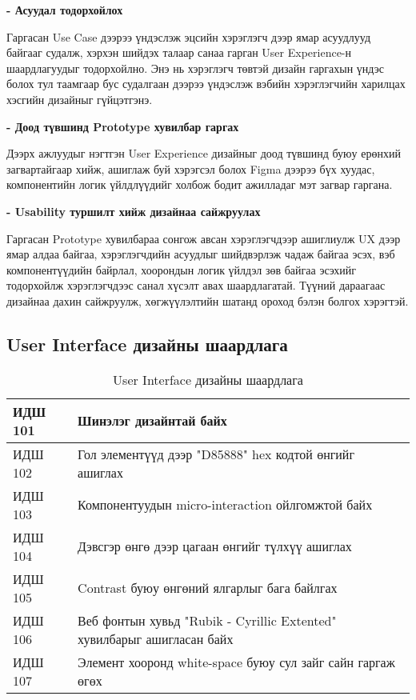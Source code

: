 \textbf{- Асуудал тодорхойлох}

Гаргасан Use Case дээрээ үндэслэж эцсийн хэрэглэгч дээр ямар асуудлууд байгааг судалж, хэрхэн шийдэх талаар санаа гарган User Experience-н шаардлагуудыг тодорхойлно. Энэ нь хэрэглэгч төвтэй дизайн гаргахын үндэс болох тул таамгаар бус судалгаан дээрээ үндэслэж вэбийн хэрэглэгчийн харилцах хэсгийн дизайныг гүйцэтгэнэ.

\textbf{- Доод түвшинд Prototype хувилбар гаргах}

Дээрх ажлуудыг нэгтгэн User Experience дизайныг доод түвшинд буюу ерөнхий загвартайгаар хийж, ашиглаж буй хэрэгсэл болох Figma дээрээ бүх хуудас, компонентийн логик үйлдлүүдийг холбож бодит ажилладаг мэт загвар гаргана.

\textbf{- Usability туршилт хийж дизайнаа сайжруулах}

Гаргасан Prototype хувилбараа сонгож авсан хэрэглэгчдээр ашиглиулж UX дээр ямар алдаа байгаа, хэрэглэгчдийн асуудлыг шийдвэрлэж чадаж байгаа эсэх, вэб компонентүүдийн байрлал, хоорондын логик үйлдэл зөв байгаа эсэхийг тодорхойлж хэрэглэгчдээс санал хүсэлт авах шаардлагатай. Түүний дараагаас дизайнаа дахин сайжруулж, хөгжүүлэлтийн шатанд ороход бэлэн болгох хэрэгтэй.

\subsection{User Interface дизайны шаардлага}

\begin{table}[h]
	\centering
	\caption{User Interface дизайны шаардлага}
	\begin{tabular}{ |p{2cm}|p{13cm}| }
	\hline
	ИДШ 101 &  Шинэлэг дизайнтай байх \\ \hline
	ИДШ 102 &  Гол элементүүд дээр "D85888" hex кодтой өнгийг ашиглах \\ \hline
	ИДШ 103 &  Компонентуудын micro-interaction ойлгомжтой байх \\ \hline
	ИДШ 104 &  Дэвсгэр өнгө дээр цагаан өнгийг түлхүү ашиглах \\ \hline
	ИДШ 105 &  Contrast буюу өнгөний ялгарлыг бага байлгах \\ \hline
	ИДШ 106 &  Веб фонтын хувьд "Rubik - Cyrillic Extented" хувилбарыг ашигласан байх \\ \hline
	ИДШ 107 &  Элемент хооронд white-space буюу сул зайг сайн гаргаж өгөх \\  \hline
\end{tabular}
\end{table}